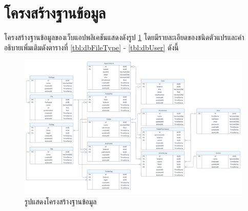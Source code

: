 \documentclass[12pt,oneside,openright,a4paper]{cpe-thai-project}
\begin{document}
\section{โครงสร้างฐานข้อมูล}
\hspace*{1cm}โครงสร้างฐานข้อมูลของเว็บแอปพลิเคชันแสดงดังรูป \ref{fig:erDiagram} โดยมีรายละเอียดของชนิดตัวแปรและคํา
อธิบายเพิ่มเติมดังตารางที่ \ref{tbl:dbFileType} - \ref{tbl:dbUser} ดังนี้
\begin{figure}[!ht]\centering
    \includegraphics[width=16cm]{./assets/er-diagram.png}
    \caption{รูปแสดงโครงสร้างฐานข้อมูล}\label{fig:erDiagram}
\end{figure}
\end{document}
